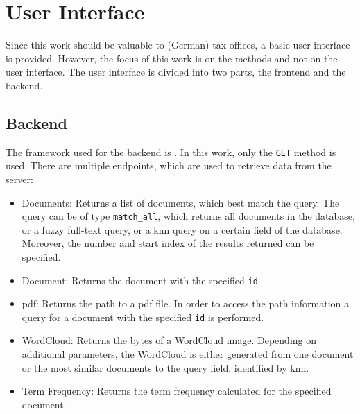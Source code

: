 \section{User Interface}\label{sec:ui}

Since this work should be valuable to (German) tax offices, a basic user interface is provided.
However, the focus of this work is on the methods and not on the user interface.
The user interface is divided into two parts, the frontend and the backend.

\subsection{Backend}\label{subsec:backend}

The framework used for the backend is \flask{}.
In this work, only the \texttt{GET} method is used.
There are multiple endpoints, which are used to retrieve data from the server:

\begin{itemize}
    \item \label{pt:docs}Documents: 
        Returns a list of documents, which best match the query.
        The query can be of type \texttt{match\_all}, which returns all documents in the database, 
        or a fuzzy full-text query, 
        or a \ac{knn} query on a certain field of the database.
        Moreover, the number and start index of the results returned can be specified.

    \item \label{pt:doc}Document: 
        Returns the document with the specified \texttt{id}.

    \item \label{pt:pdf}\ac{pdf}: 
        Returns the path to a \ac{pdf} file.
        In order to access the path information a query for a document with the specified \texttt{id} is performed.
    
    \item \label{pt:wordcloud}WordCloud: 
        Returns the bytes of a WordCloud image. 
        Depending on additional parameters, the WordCloud is either generated from one document or 
        the most similar documents to the query field, identified by \ac{knn}.

    \item \label{pt:termfrequency}Term Frequency:
        Returns the term frequency calculated for the specified document.
\end{itemize}

